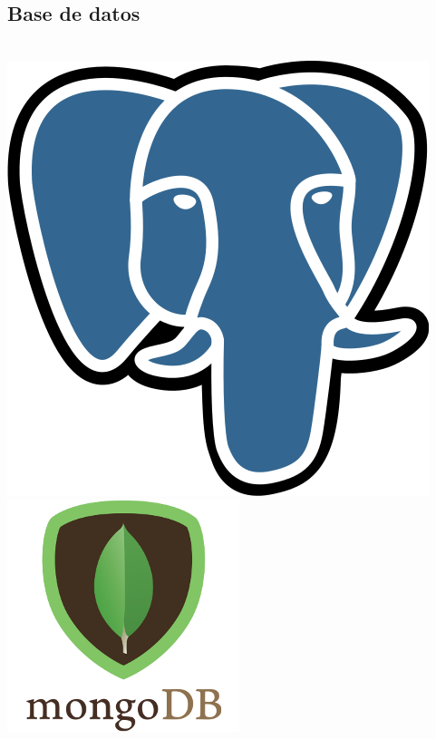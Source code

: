 \subsection{Base de datos}
\begin{frame}
    \frametitle{}
    \begin{columns}
            \includegraphics[width=\textwidth]{Postgresql.png}
            \includegraphics[width=\textwidth]{mongodb-logo.png}
    \end{columns}
\end{frame}

